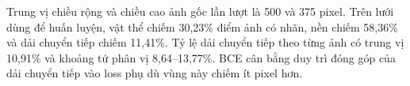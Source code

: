 Trung vị chiều rộng và chiều cao ảnh gốc lần lượt là 500 và 375 pixel. Trên lưới dùng để huấn luyện, vật thể chiếm 30{,}23\% điểm ảnh có nhãn, nền chiếm 58{,}36\% và dải chuyển tiếp chiếm 11{,}41\%. Tỷ lệ dải chuyển tiếp theo từng ảnh có trung vị 10{,}91\% và khoảng tứ phân vị 8{,}64--13{,}77\%. BCE cân bằng duy trì đóng góp của dải chuyển tiếp vào loss phụ dù vùng này chiếm ít pixel hơn.
